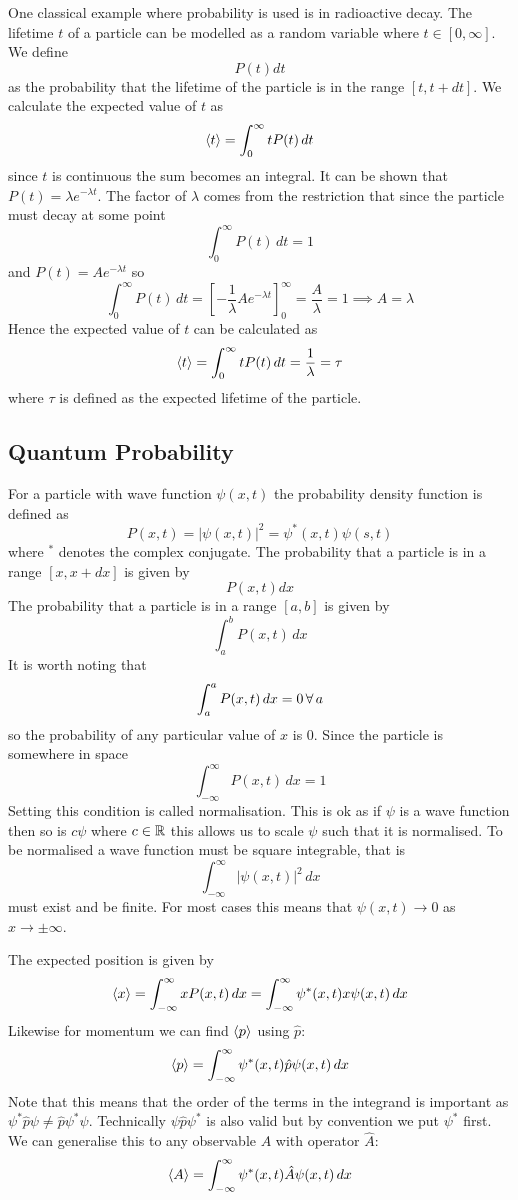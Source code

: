 \documentclass{article}
\begin{document}
    One classical example where probability is used is in radioactive decay.
    The lifetime \(t\) of a particle can be modelled as a random variable where \( t\in [0, \infty]\).
    We define
    \[P(t)dt\]
    as the probability that the lifetime of the particle is in the range \([t, t + dt]\).
    We calculate the expected value of \(t\) as
    \[\left\langle{t}\right\rangle = \int_0^\infty tP(t)\,dt\]
    since \(t\) is continuous the sum becomes an integral.
    It can be shown that \(P(t) = \lambda e^{-\lambda t}\).
    The factor of \(\lambda\) comes from the restriction that since the particle must decay at some point
    \[\int_0^\infty P(t)\,dt = 1\]
    and \(P(t) = Ae^{-\lambda t}\) so
    \[\int_0^\infty P(t)\,dt = \left[-\frac{1}{\lambda}Ae^{-\lambda t}\right]_0^\infty = \frac{A}{\lambda} = 1 \implies A = \lambda\]
    Hence the expected value of \(t\) can be calculated as
    \[\left\langle{t}\right\rangle = \int_0^\infty tP(t)\,dt = \frac{1}{\lambda} = \tau\]
    where \(\tau\) is defined as the expected lifetime of the particle.
    
    \subsection{Quantum Probability}
    For a particle with wave function \(\psi(x, t)\) the probability density function is defined as
    \[P(x, t) = |\psi(x, t)|^2 = \psi^*(x, t)\psi(s, t)\]
    where \(^*\) denotes the complex conjugate.
    The probability that a particle is in a range \([x, x + dx]\) is given by
    \[P(x, t)dx\]
    The probability that a particle is in a range \([a, b]\) is given by
    \[\int_a^bP(x, t)\,dx\]
    It is worth noting that
    \[\int_a^a P(x, t)\,dx = 0\,\forall\, a\]
    so the probability of any particular value of \(x\) is 0.
    Since the particle is somewhere in space
    \[\int_{-\infty}^\infty P(x, t)\,dx = 1\]
    Setting this condition is called normalisation.
    This is ok as if \(\psi\) is a wave function then so is \(c\psi\) where \(c\in \mathbb{R}\) this allows us to scale \(\psi\) such that it is normalised.
    To be normalised a wave function must be square integrable, that is
    \[\int_{-\infty}^\infty |\psi(x, t)|^2\,dx\]
    must exist and be finite.
    For most cases this means that \(\psi(x, t)\to 0\) as \(x\to\pm\infty\).
    
    The expected position is given by
    \[\left\langle{x}\right\rangle = \int_{-\infty}^\infty xP(x, t)\,dx = \int_{-\infty}^\infty \psi^*(x, t)x\psi(x, t)\,dx\]
    Likewise for momentum we can find \(\left\langle{p}\right\rangle\) using \(\hat p\):
    \[\left\langle{p}\right\rangle = \int_{-\infty}^\infty \psi^*(x, t)\hat p\psi(x, t)\,dx\]
    Note that this means that the order of the terms in the integrand is important as \(\psi^*\hat p\psi\ne \hat p\psi^*\psi\).
    Technically \(\psi\hat p\psi^*\) is also valid but by convention we put \(\psi^*\) first.
    We can generalise this to any observable \(A\) with operator \(\hat A\):
    \[\left\langle{A}\right\rangle = \int_{-\infty}^\infty \psi^*(x, t)\hat A\psi(x, t)\,dx\]
    
\end{document}
